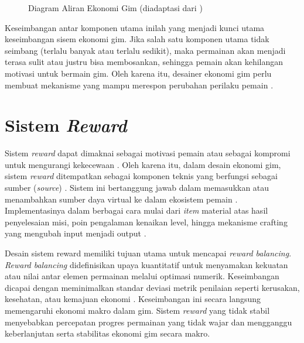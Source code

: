 \begin{figure}[htbp]
\caption*{\textbf{Keterangan:} Angka pada panah menunjukkan bobot aliran sumber daya. 
Tanda + berarti penambahan, - berarti pengurangan, desimal (0.3) menunjukkan probabilitas 30\%.}
\caption{Diagram Aliran Ekonomi Gim (diadaptasi dari \cite{Rupp_2024})}
\label{fig:game_economy}
\end{figure}

Keseimbangan antar komponen utama inilah yang menjadi kunci utama keseimbangan sisem ekonomi gim. Jika salah satu komponen utama tidak seimbang (terlalu banyak atau terlalu sedikit), maka permainan akan menjadi terasa sulit atau justru bisa membosankan, sehingga pemain akan kehilangan motivasi untuk bermain gim. Oleh karena itu, desainer ekonomi gim perlu membuat mekanisme yang mampu merespon perubahan perilaku pemain \citep{BowmanKeeneNajera2021}.

\section{Sistem \textit{Reward}}\label{}
Sistem \textit{reward} dapat dimaknai sebagai motivasi pemain atau sebagai kompromi untuk mengurangi kekecewaan \citep{Hamari2010}. Oleh karena itu, dalam desain ekonomi gim, sistem \textit{reward} ditempatkan sebagai komponen teknis yang berfungsi sebagai sumber (\textit{source}) . Sistem ini bertanggung jawab dalam memasukkan atau menambahkan sumber daya virtual ke dalam ekosistem pemain \citep{RanandehMirzaBabaei2023}. Implementasinya dalam berbagai cara mulai dari \textit{item} material atas hasil penyelesaian misi, poin pengalaman kenaikan level, hingga mekanisme crafting yang mengubah input menjadi output \citep{Hamari2010}. 

Desain sistem reward memiliki tujuan utama untuk mencapai \textit{reward balancing}. \textit{Reward balancing} didefinisikan upaya kuantitatif untuk menyamakan kekuatan atau nilai antar elemen permainan melalui optimasi numerik. Keseimbangan dicapai dengan meminimalkan standar deviasi metrik penilaian seperti kerusakan, kesehatan, atau kemajuan ekonomi \citep{9750161}. Keseimbangan ini secara langsung memengaruhi ekonomi makro dalam gim. Sistem \textit{reward} yang tidak stabil menyebabkan percepatan progres permainan yang tidak wajar dan mengganggu keberlanjutan serta stabilitas ekonomi gim secara makro.

